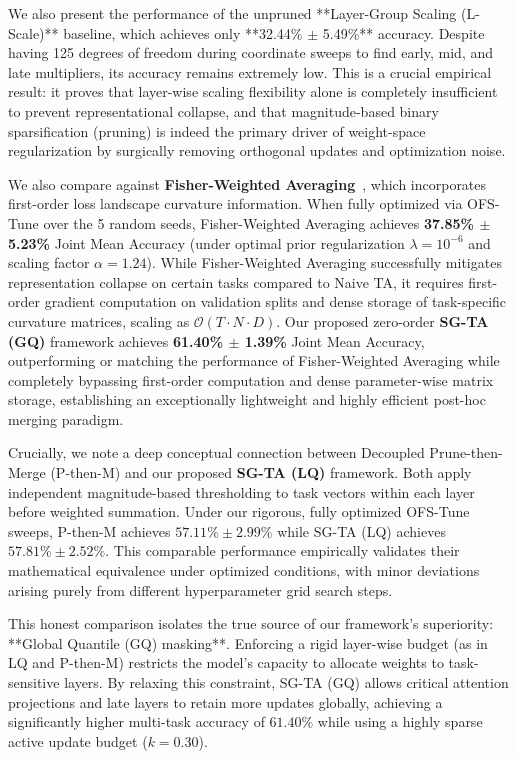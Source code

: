 We also present the performance of the unpruned **Layer-Group Scaling (L-Scale)** baseline, which achieves only **32.44\% $\pm$ 5.49\%** accuracy. Despite having 125 degrees of freedom during coordinate sweeps to find early, mid, and late multipliers, its accuracy remains extremely low. This is a crucial empirical result: it proves that layer-wise scaling flexibility alone is completely insufficient to prevent representational collapse, and that magnitude-based binary sparsification (pruning) is indeed the primary driver of weight-space regularization by surgically removing orthogonal updates and optimization noise.

We also compare against \textbf{Fisher-Weighted Averaging}~\cite{matena2022merging}, which incorporates first-order loss landscape curvature information. When fully optimized via OFS-Tune over the 5 random seeds, Fisher-Weighted Averaging achieves \textbf{37.85\% $\pm$ 5.23\%} Joint Mean Accuracy (under optimal prior regularization $\lambda = 10^{-6}$ and scaling factor $\alpha = 1.24$). While Fisher-Weighted Averaging successfully mitigates representation collapse on certain tasks compared to Naive TA, it requires first-order gradient computation on validation splits and dense storage of task-specific curvature matrices, scaling as $\mathcal{O}(T \cdot N \cdot D)$. Our proposed zero-order \textbf{SG-TA (GQ)} framework achieves \textbf{61.40\% $\pm$ 1.39\%} Joint Mean Accuracy, outperforming or matching the performance of Fisher-Weighted Averaging while completely bypassing first-order computation and dense parameter-wise matrix storage, establishing an exceptionally lightweight and highly efficient post-hoc merging paradigm.

Crucially, we note a deep conceptual connection between Decoupled Prune-then-Merge (P-then-M) and our proposed \textbf{SG-TA (LQ)} framework. Both apply independent magnitude-based thresholding to task vectors within each layer before weighted summation. Under our rigorous, fully optimized OFS-Tune sweeps, P-then-M achieves $57.11\% \pm 2.99\%$ while SG-TA (LQ) achieves $57.81\% \pm 2.52\%$. This comparable performance empirically validates their mathematical equivalence under optimized conditions, with minor deviations arising purely from different hyperparameter grid search steps.

This honest comparison isolates the true source of our framework's superiority: **Global Quantile (GQ) masking**. Enforcing a rigid layer-wise budget (as in LQ and P-then-M) restricts the model's capacity to allocate weights to task-sensitive layers. By relaxing this constraint, SG-TA (GQ) allows critical attention projections and late layers to retain more updates globally, achieving a significantly higher multi-task accuracy of $61.40\%$ while using a highly sparse active update budget ($k=0.30$).

